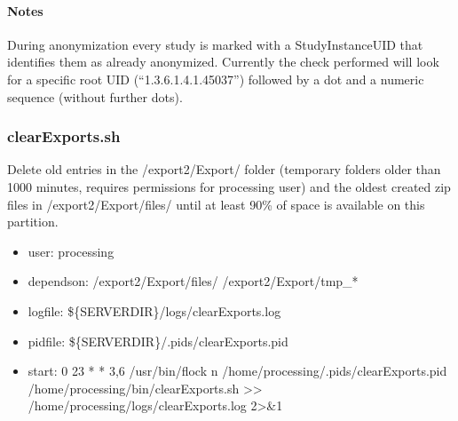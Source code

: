 \documentclass[letterpaper,10pt,english]{sphinxmanual}
\begin{document}
\paragraph{Notes}
\label{\detokenize{Architecture/scripts/anonymizeAndSend:notes}}
\sphinxAtStartPar
During anonymization every study is marked with a StudyInstanceUID that identifies them as already anonymized. Currently the check performed will look for a specific root UID (“1.3.6.1.4.1.45037”) followed by a dot and a numeric sequence (without further dots).

\sphinxstepscope


\subsubsection{clearExports.sh}
\label{\detokenize{Architecture/scripts/clearExports:clearexports-sh}}\label{\detokenize{Architecture/scripts/clearExports::doc}}
\sphinxAtStartPar
Delete old entries in the /export2/Export/ folder (temporary folders older than 1000 minutes, requires permissions for processing user) and the oldest created zip files in /export2/Export/files/ until at least 90\% of space is available on this partition.
\begin{itemize}
\item {} 
\sphinxAtStartPar
user: processing

\item {} 
\sphinxAtStartPar
depends\sphinxhyphen{}on:
\sphinxhyphen{} /export2/Export/files/
\sphinxhyphen{} /export2/Export/tmp\_*

\item {} 
\sphinxAtStartPar
log\sphinxhyphen{}file:
\sphinxhyphen{} \$\{SERVERDIR\}/logs/clearExports.log

\item {} 
\sphinxAtStartPar
pid\sphinxhyphen{}file: \$\{SERVERDIR\}/.pids/clearExports.pid

\item {} 
\sphinxAtStartPar
start:
0 23 * * 3,6 /usr/bin/flock \sphinxhyphen{}n /home/processing/.pids/clearExports.pid /home/processing/bin/clearExports.sh \textgreater{}\textgreater{} /home/processing/logs/clearExports.log 2\textgreater{}\&1

\end{itemize}

\sphinxstepscope
\end{document}
